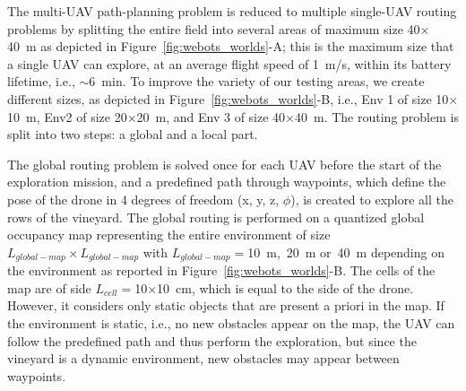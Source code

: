 The multi-UAV path-planning problem is reduced to multiple single-UAV routing problems by splitting the entire field into several areas of maximum size 40$\times$\SI{40}{\meter} as depicted in Figure~\ref{fig:webots_worlds}-A; this is the maximum size that a single UAV can explore, at an average flight speed of \SI{1}{\meter/\second}, within its battery lifetime, i.e., $\sim$\SI{6}{\minute}.
To improve the variety of our testing areas, we create different sizes, as depicted in Figure~\ref{fig:webots_worlds}-B, i.e., Env 1 of size 10$\times$\SI{10}{\meter}, Env2 of size 20$\times$\SI{20}{\meter}, and Env 3 of size 40$\times$\SI{40}{\meter}.
The routing problem is split into two steps: a global and a local part.

The global routing problem is solved once for each UAV before the start of the exploration mission, and a predefined path through waypoints, which define the pose of the drone in 4 degrees of freedom (x, y, z, $\phi$), is created to explore all the rows of the vineyard. 
The global routing is performed on a quantized global occupancy map representing the entire environment of size $L_{global - map} \times L_{global - map}$ with $L_{global - map}=$\SI{10}{\meter},~\SI{20}{\meter} or~\SI{40}{\meter} depending on the environment as reported in Figure~\ref{fig:webots_worlds}-B.
The cells of the map are of side $L_{cell}=$10$\times$\SI{10}{\centi\meter}, which is equal to the side of the drone.
However, it considers only static objects that are present a priori in the map.
If the environment is static, i.e., no new obstacles appear on the map, the UAV can follow the predefined path and thus perform the exploration, but since the vineyard is a dynamic environment, new obstacles may appear between waypoints. 

